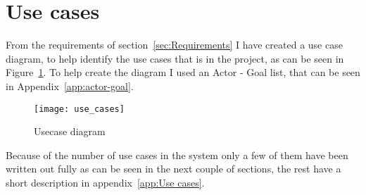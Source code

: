 \section{Use cases}
\label{sec:Use cases}
From the requirements of section~\ref{sec:Requirements} I have created a use case diagram, to help identify the use cases that is in the project, as can be seen in Figure~\ref{fig:usecase_diagram}. To help create the diagram I used an Actor - Goal list, that can be seen in Appendix~\ref{app:actor-goal}.

\begin{figure}[h]
  \centering
  \texttt{[image: use\_cases]}
  \caption{Usecase diagram}
  \label{fig:usecase_diagram}
\end{figure}

Because of the number of use cases in the system only a few of them have been written out fully as can be seen in the next couple of sections, the rest have a short description in appendix~\ref{app:Use cases}.

